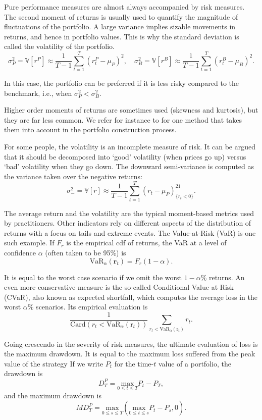 \documentclass[]{krantz}
\theoremstyle{definition}
\theoremstyle{definition}
\theoremstyle{definition}
\theoremstyle{remark}
\begin{document}
Pure performance measures are almost always accompanied by risk
measures. The second moment of returns is usually used to quantify the
magnitude of fluctuations of the portfolio. A large variance implies
sizable movements in returns, and hence in portfolio values. This is why
the standard deviation is called the volatility of the portfolio.
\[\sigma^2_P=\mathbb{V}[r^P]\approx \frac{1}{T-1}\sum_{t=1}^T (r_t^P-\mu_P)^2, \quad \sigma^2_B=\mathbb{V}[r^B]\approx \frac{1}{T-1}\sum_{t=1}^T (r_t^B-\mu_B)^2.\]

In this case, the portfolio can be preferred if it is less risky
compared to the benchmark, i.e., when \(\sigma_P^2<\sigma_B^2\).

Higher order moments of returns are sometimes used (skewness and
kurtosis), but they are far less common. We refer for instance to
\citet{harvey2010portfolio} for one method that takes them into account
in the portfolio construction process.

For some people, the volatility is an incomplete measure of risk. It can
be argued that it should be decomposed into `good' volatility (when
prices go up) versus `bad' volatility when they go down. The downward
semi-variance is computed as the variance taken over the negative
returns:
\[\sigma^2_-=\mathbb{V}[r]\approx \frac{1}{T-1}\sum_{t=1}^T (r_t-\mu_P)^21_{\{r_t<0\}}.\]

The average return and the volatility are the typical moment-based
metrics used by practitioners. Other indicators rely on different
aspects of the distribution of returns with a focus on tails and extreme
events. The Value-at-Risk (VaR) is one such example. If \(F_r\) is the
empirical cdf of returns, the VaR at a level of confidence \(\alpha\)
(often taken to be 95\%) is
\[\text{VaR}_\alpha(\textbf{r}_t)=F_r(1-\alpha).\]

It is equal to the worst case scenario if we omit the worst
\(1-\alpha\)\% returns. An even more conservative measure is the
so-called Conditional Value at Risk (CVaR), also known as expected
shortfall, which computes the average loss in the worst \(\alpha\)\%
scenarios. Its empirical evaluation is
\[\frac{1}{\text{Card}(r_t < \text{VaR}_\alpha(\text{r}_t))}\sum_{r_t < \text{VaR}_\alpha(\text{r}_t)}r_t.\]

Going crescendo in the severity of risk measures, the ultimate
evaluation of loss is the maximum drawdown. It is equal to the maximum
loss suffered from the peak value of the strategy If we write \(P_t\)
for the time-\(t\) value of a portfolio, the drawdown is
\[D_T^P=\underset{0 \le t \le T}{\text{max}} P_t-P_T ,\] and the maximum
drawdown is
\[MD_T^P=\underset{0 \le s \le T}{\text{max}} \left(\underset{0 \le t \le s}{\text{max}} P_t-P_s, 0\right) .\]
\end{document}
